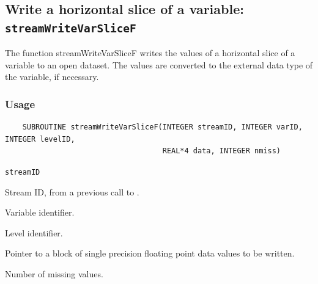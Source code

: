 \subsection{Write a horizontal slice of a variable: {\tt streamWriteVarSliceF}}
\label{streamWriteVarSliceF}

The function streamWriteVarSliceF writes the values of a horizontal slice of a variable to an open dataset.
The values are converted to the external data type of the variable, if necessary.
\subsubsection*{Usage}

\begin{verbatim}
    SUBROUTINE streamWriteVarSliceF(INTEGER streamID, INTEGER varID, INTEGER levelID, 
                                    REAL*4 data, INTEGER nmiss)
\end{verbatim}

\hspace*{4mm}\begin{minipage}[]{15cm}
\begin{deflist}{\tt streamID\ }
\item[{\tt streamID}]
Stream ID, from a previous call to {}.
\item[{\tt varID}]
Variable identifier.
\item[{\tt levelID}]
Level identifier.
\item[{\tt data}]
Pointer to a block of single precision floating point data values to be written.
\item[{\tt nmiss}]
Number of missing values.

\end{deflist}
\end{minipage}
